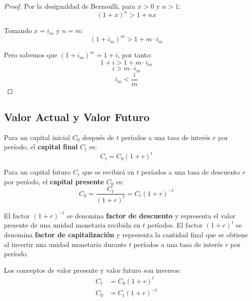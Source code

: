 \begin{proof}
Por la desigualdad de Bernoulli, para $x > 0$ y $n > 1$:
$$(1 + x)^n > 1 + nx$$

Tomando $x = i_m$ y $n = m$:
$$(1 + i_m)^m > 1 + m \cdot i_m$$

Pero sabemos que $(1 + i_m)^m = 1 + i$, por tanto:
$$1 + i > 1 + m \cdot i_m$$
$$i > m \cdot i_m$$
$$i_m < \frac{i}{m}$$
\end{proof}

\subsection{Valor Actual y Valor Futuro}

\begin{definicion}
Para un capital inicial $C_0$ después de $t$ períodos a una tasa de interés $r$ por período, el \textbf{capital final} $C_t$ es:
\begin{equation}
C_t = C_0(1 + r)^t
\end{equation}
\end{definicion}

\begin{definicion}
Para un capital futuro $C_t$ que se recibirá en $t$ períodos a una tasa de descuento $r$ por período, el \textbf{capital presente} $C_0$ es:
\begin{equation}
C_0 = \frac{C_t}{(1 + r)^t} = C_t(1 + r)^{-t}
\end{equation}
\end{definicion}

El factor $(1 + r)^{-t}$ se denomina \textbf{factor de descuento} y representa el valor presente de una unidad monetaria recibida en $t$ períodos. El factor $(1 + r)^t$ se denomina \textbf{factor de capitalización} y representa la cantidad final que se obtiene al invertir una unidad monetaria durante $t$ períodos a una tasa de interés $r$ por período.

\begin{proposicion}
Los conceptos de valor presente y valor futuro son inversos:
\begin{align}
C_t &= C_0(1 + r)^t \\
C_0 &= C_t(1 + r)^{-t}
\end{align}
\end{proposicion}

\begin{center}
    
\end{center}


